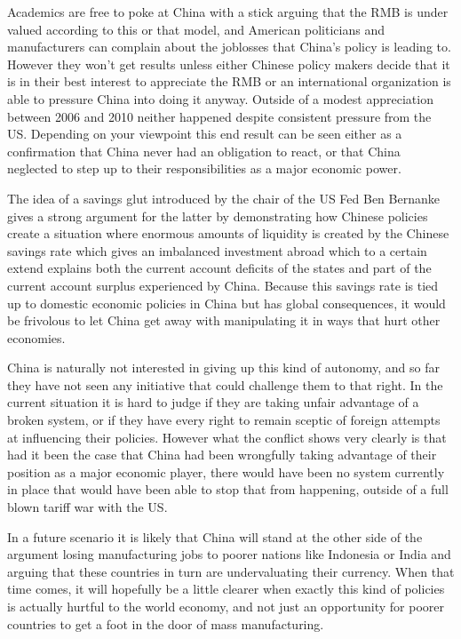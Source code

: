Academics are free to poke at China with a stick arguing that the RMB is 
under valued according to this or that model, and American politicians 
and manufacturers can complain about the joblosses that China's policy 
is leading to. However they won't get results unless either Chinese 
policy makers decide that it is in their best interest to appreciate the 
RMB or an international organization is able to pressure China into 
doing it anyway. Outside of a modest appreciation between 2006 and 2010 
neither happened despite consistent pressure from the US. Depending on 
your viewpoint this end result can be seen either as a confirmation that 
China never had an obligation to react, or that China neglected to step 
up to their responsibilities as a major economic power.

The idea of a savings glut introduced by the chair of the US Fed Ben 
Bernanke gives a strong argument for the latter by demonstrating how 
Chinese policies create a situation where enormous amounts of liquidity 
is created by the Chinese savings rate which gives an imbalanced 
investment abroad which to a certain extend explains both the current 
account deficits of the states and part of the current account surplus 
experienced by China. Because this savings rate is tied up to domestic 
economic policies in China but has global consequences, it would be 
frivolous to let China get away with manipulating it in ways that hurt 
other economies.

China is naturally not interested in giving up this kind of autonomy, 
and so far they have not seen any initiative that could challenge them 
to that right. In the current situation it is hard to judge if they are 
taking unfair advantage of a broken system, or if they have every right 
to remain sceptic of foreign attempts at influencing their policies.  
However what the conflict shows very clearly is that had it been the 
case that China had been wrongfully taking advantage of their position 
as a major economic player, there would have been no system currently in 
place that would have been able to stop that from happening, outside of 
a full blown tariff war with the US.

In a future scenario it is likely that China will stand at the other 
side of the argument losing manufacturing jobs to poorer nations like 
Indonesia or India and arguing that these countries in turn are 
undervaluating their currency. When that time comes, it will hopefully 
be a little clearer when exactly this kind of policies is actually 
hurtful to the world economy, and not just an opportunity for poorer 
countries to get a foot in the door of mass manufacturing.

